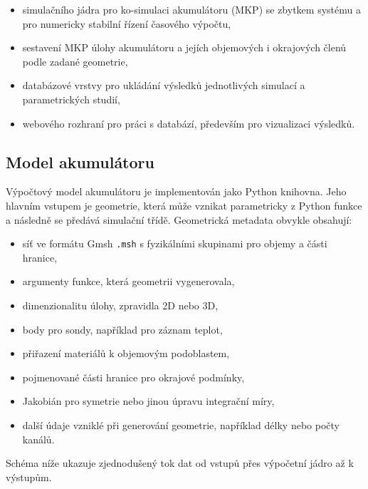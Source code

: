 \documentclass[a4paper,11pt]{article}
\begin{document}
\begin{itemize}
  \item simulačního jádra pro ko-simulaci akumulátoru (MKP) se zbytkem systému
        a pro numericky stabilní řízení časového výpočtu,
  \item sestavení MKP úlohy akumulátoru a jejích objemových i okrajových členů
        podle zadané geometrie,
  \item databázové vrstvy pro ukládání výsledků jednotlivých simulací a
        parametrických studií,
  \item webového rozhraní pro práci s databází, především pro vizualizaci
        výsledků.
\end{itemize}

\subsection*{Model akumulátoru}

Výpočtový model akumulátoru je implementován jako Python knihovna. Jeho hlavním
vstupem je geometrie, která může vznikat parametricky z Python funkce a následně
se předává simulační třídě. Geometrická metadata obvykle obsahují:

\begin{itemize}
  \item síť ve formátu Gmsh \texttt{.msh} s fyzikálními skupinami pro objemy a
        části hranice,
  \item argumenty funkce, která geometrii vygenerovala,
  \item dimenzionalitu úlohy, zpravidla 2D nebo 3D,
  \item body pro sondy, například pro záznam teplot,
  \item přiřazení materiálů k objemovým podoblastem,
  \item pojmenované části hranice pro okrajové podmínky,
  \item Jakobián pro symetrie nebo jinou úpravu integrační míry,
  \item další údaje vzniklé při generování geometrie, například délky nebo počty
        kanálů.
\end{itemize}

Schéma níže ukazuje zjednodušený tok dat od vstupů přes výpočetní jádro až
k výstupům.
\end{document}
